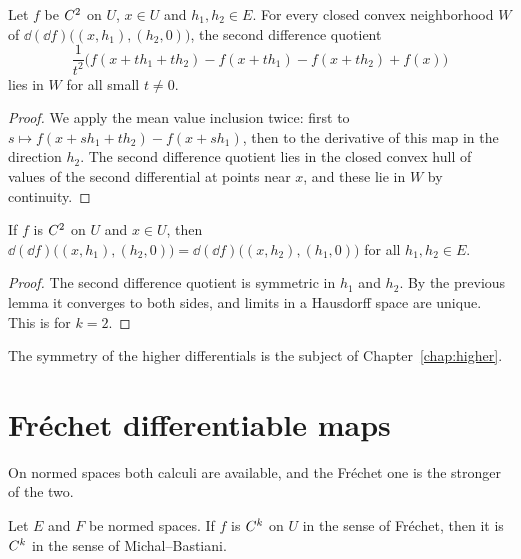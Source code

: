\begin{lemma}
  \label{lem:second-diff}
  \leanok
  Let $f$ be $C^{2}$ on $U$, $x \in U$ and $h_1, h_2 \in E$. For every closed convex
  neighborhood $W$ of $\dd(\dd f)\bigl((x, h_1), (h_2, 0)\bigr)$, the second difference quotient
  \[
    \frac{1}{t^2}\bigl(f(x + t h_1 + t h_2) - f(x + t h_1) - f(x + t h_2) + f(x)\bigr)
  \]
  lies in $W$ for all small $t \neq 0$.
\end{lemma}

\begin{proof}
  \leanok
  We apply the mean value inclusion twice: first to $s \mapsto f(x + s h_1 + t h_2) - f(x + s h_1)$,
  then to the derivative of this map in the direction $h_2$. The second difference quotient
  lies in the closed convex hull of values of the second differential at points near $x$, and
  these lie in $W$ by continuity.
\end{proof}

\begin{theorem}
  \label{thm:symm2}
  \leanok
  If $f$ is $C^{2}$ on $U$ and $x \in U$, then
  $\dd(\dd f)\bigl((x, h_1), (h_2, 0)\bigr) = \dd(\dd f)\bigl((x, h_2), (h_1, 0)\bigr)$ for all
  $h_1, h_2 \in E$.
\end{theorem}

\begin{proof}
  \leanok
  The second difference quotient is symmetric in $h_1$ and $h_2$. By the previous lemma it
  converges to both sides, and limits in a Hausdorff space are unique. This is \cite[1.3.17]{GN26} for
  $k = 2$.
\end{proof}

The symmetry of the higher differentials is the subject of Chapter~\ref{chap:higher}.

\section{Fréchet differentiable maps}

On normed spaces both calculi are available, and the Fréchet one is the stronger of the two.

\begin{proposition}
  \label{prop:frechet-to-mb}
  \leanok
  Let $E$ and $F$ be normed spaces. If $f$ is $C^{k}$ on $U$ in the sense of Fréchet, then it
  is $C^{k}$ in the sense of Michal--Bastiani.
\end{proposition}

